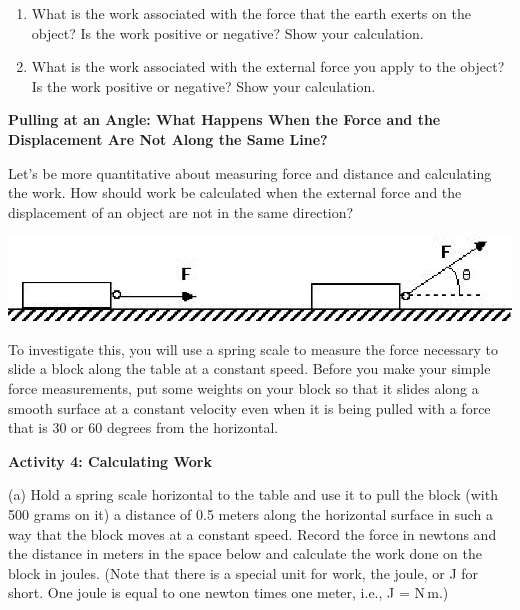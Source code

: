 \begin{enumerate}
\item What is the work associated with the force that the earth exerts on the object? Is the work positive or negative? Show your calculation.
\vspace{20mm}

\item What is the work associated with the external force you apply to the object? Is the work positive or negative? Show your calculation.
\vspace{20mm}

\end{enumerate}
\textbf{Pulling at an Angle: What Happens When the Force and the Displacement
Are Not Along the Same Line? }

Let's be more quantitative about measuring force and distance and calculating
the work. How should work be calculated when the external force and the 
displacement of an object are not in the same direction?

\vspace{0.3cm}
{\par\centering \includegraphics{work_power_fig6.eps} \par}
\vspace{0.3cm}

To investigate this, you will use a spring scale to measure the force necessary
to slide a block along the table at a constant speed. Before you make your simple force measurements, put some weights on your block so that it slides along a smooth surface at a constant velocity even when it is being pulled with a force that is 30 or 60 degrees from the horizontal.

\textbf{Activity 4: Calculating Work} 

(a) Hold a spring scale horizontal to the table and use it to pull the block 
(with 500 grams on it)
a distance of 0.5 meters along the horizontal surface in such a way that the
block moves at a constant speed. Record the force in newtons and the distance
in meters in the space below and calculate the work done on the block in joules.
(Note that there is a special unit for work, the joule, or J for short. One 
joule is equal to one newton times one meter, i.e., J = N\,m.)
\vspace{20mm}

